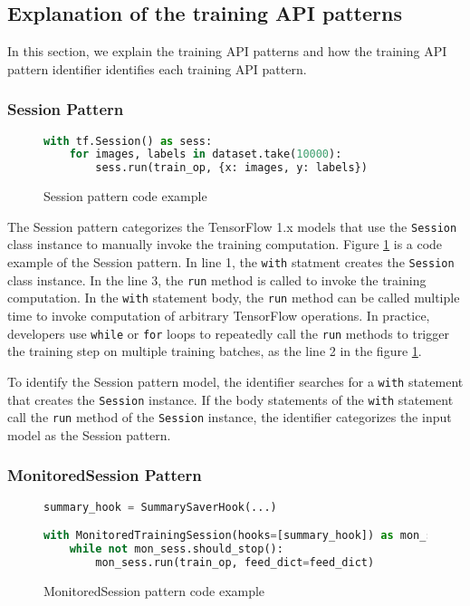 \subsection{Explanation of the training API patterns}

In this section, we explain the training API patterns and how
the training API pattern identifier identifies each training API pattern.

\subsubsection{Session Pattern}

\begin{figure}[!ht]
\begin{lstlisting}[language=Python]
with tf.Session() as sess:
    for images, labels in dataset.take(10000):
        sess.run(train_op, {x: images, y: labels})
\end{lstlisting}
\caption{Session pattern code example}
\label{fig:sessionpattern}
\end{figure}

The Session pattern categorizes the TensorFlow 1.x models that
use the {\tt Session} class instance to manually invoke the training 
computation. Figure \ref{fig:sessionpattern} is a code example of the Session 
pattern. In line 1, the {\tt with} statment creates the {\tt Session}
class instance. In the line 3, the {\tt run} method is called to invoke 
the training computation. 
In the {\tt with} statement body, the {\tt run} method can be called multiple
time to invoke computation of arbitrary TensorFlow operations.
In practice, developers use {\tt while} or {\tt for} loops to repeatedly call
the {\tt run} methods to trigger the training step on multiple training batches,
as the line 2 in the figure \ref{fig:sessionpattern}.

To identify the Session pattern model, the identifier 
searches for a {\tt with} statement that creates the {\tt Session} instance.
If the body statements of the {\tt with} statement call the 
{\tt run} method of the {\tt Session} instance,
the identifier categorizes the input model as the Session pattern. 


\subsubsection{MonitoredSession Pattern}

\begin{figure}[!ht]
  \begin{lstlisting}[language=Python]
summary_hook = SummarySaverHook(...)

with MonitoredTrainingSession(hooks=[summary_hook]) as mon_sess:
    while not mon_sess.should_stop():
        mon_sess.run(train_op, feed_dict=feed_dict)
  \end{lstlisting}
  \caption{MonitoredSession pattern code example}
  \label{fig:monsesspattern}
\end{figure}

